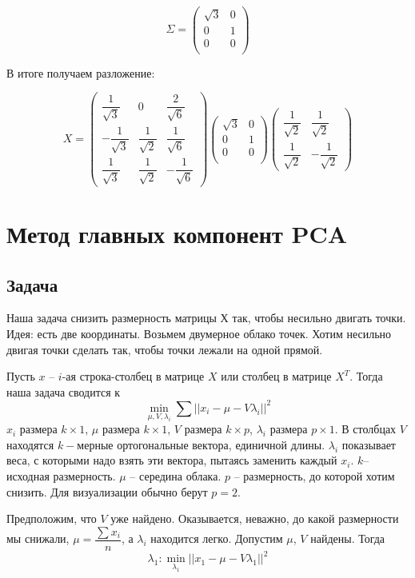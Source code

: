 \documentclass[12pt]{article} %
\theoremstyle{definition} %
\begin{document}
\[
\Sigma = \begin{pmatrix}
\sqrt{3} & 0 \\
0 & 1 \\
0 & 0 \\
\end{pmatrix}
\]
 
В итоге получаем разложение:

\[
X= \begin{pmatrix}
\dfrac{1}{\sqrt{3}} & 0 & \dfrac{2}{\sqrt{6}} \\
-\dfrac{1}{\sqrt{3}} & \dfrac{1}{\sqrt{2}} & \dfrac{1}{\sqrt{6}} \\
\dfrac{1}{\sqrt{3}} & \dfrac{1}{\sqrt{2}} & -\dfrac{1}{\sqrt{6}} 
\end{pmatrix}  \begin{pmatrix}
\sqrt{3} & 0 \\
0 & 1 \\
0 & 0 \\
\end{pmatrix}
\begin{pmatrix}
\dfrac{1}{\sqrt{2}} & \dfrac{1}{\sqrt{2}} \\
\dfrac{1}{\sqrt{2}} & -\dfrac{1}{\sqrt{2}} 
\end{pmatrix}
\]

\section{Метод главных компонент PCA}
\subsection{Задача}
Наша задача снизить размерность матрицы $Х$ так, чтобы несильно двигать точки.
Идея: есть две координаты. Возьмем двумерное облако точек. Хотим несильно двигая точки сделать так, чтобы точки лежали на одной прямой. 

Пусть $x$ -- $i$-ая строка-столбец в матрице $X$ или столбец в матрице $X^T$.
Тогда наша задача сводится к
\[\min_{\mu, V, \lambda_i} \sum ||x_i-\mu-V \lambda_i||^2 \]
$x_i$ размера $k \times 1$, $\mu$ размера $k \times 1$, $V$ размера $k \times p$, $\lambda_i$ размера $p \times 1$.
В столбцах $V$ находятся $k-$мерные ортогональные вектора, единичной длины. $\lambda_i$ показывает веса, с которыми надо взять эти вектора, пытаясь заменить каждый $x_i$. $k$-- исходная размерность.
$\mu$ -- середина облака.  $p$ -- размерность, до которой хотим снизить. Для визуализации обычно берут $p=2$.

Предположим, что $V$ уже найдено. Оказывается, неважно, до какой размерности мы снижали, $\mu=\dfrac{\sum x_i}{n}$, а $\lambda_i$ находится легко.
Допустим $\mu$, $V$ найдены. Тогда 
\[ \lambda_1: \min_\lambda_1 ||x_1-\mu-V \lambda_1||^2 \]
\end{document}
